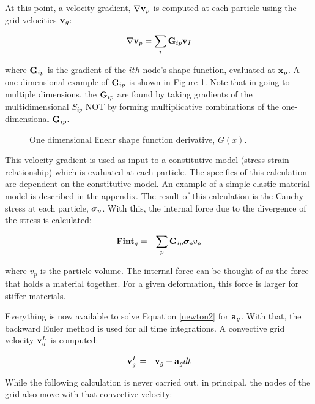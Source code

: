 At this point, a velocity gradient,  $\nabla \mbox{\ensuremath{\mathbf{v}}}_p$ is 
computed at
each particle using the grid velocities $\mbox{\ensuremath{\mathbf{v}}}_g$:

\begin{eqnarray}
	\nabla \mbox{\ensuremath{\mathbf{v}}}_p = \sum_i \mbox{\ensuremath{\mathbf{G}}}_{ip} \mbox{\ensuremath{\mathbf{v}}}_I
 \label{velgrad}
\end{eqnarray}

\noindent
where $\mbox{\ensuremath{\mathbf{G}}}_{ip}$ is the gradient of the $ith$ node's shape 
function,
evaluated at $\mbox{\ensuremath{\mathbf{x}}}_p$.  A one dimensional example of 
$\mbox{\ensuremath{\mathbf{G}}}_{ip}$ is
shown in Figure \ref{fig-Gip}.  Note that in going to multiple dimensions,
the $\mbox{\ensuremath{\mathbf{G}}}_{ip}$ are found by taking gradients of the multidimensional
$S_{ip}$ NOT by forming multiplicative combinations of the one-dimensional
$\mbox{\ensuremath{\mathbf{G}}}_{ip}$.

\begin{figure}[h]
  \hspace{1.75in}
  \caption{\label{fig-Gip} One dimensional linear shape function 
           derivative, $G(x)$.}
\end{figure}
This velocity gradient is used as input to a constitutive model 
(stress-strain
relationship) which is evaluated at each particle.  The 
specifics of this 
calculation are dependent on the constitutive model.  An example 
of a simple elastic material model is described in the appendix.  
The result of this
calculation is the Cauchy stress at each particle, $\boldsymbol{\sigma}_p$.  
With this,
the internal force due to the divergence of the stress is 
calculated:

\begin{eqnarray}
	\mbox{\ensuremath{\mathbf{Fint}}}_g &=& \sum_{p} \mbox{\ensuremath{\mathbf{G}}}_{ip} \mbox{\boldmath $\sigma \!\!$ \unboldmath}_p v_p
\end{eqnarray}

\noindent
where $v_p$ is the particle volume.  The internal force can be 
thought of as the force that holds a material together.  For a 
given deformation, this force is larger for stiffer materials.

Everything is now available to solve Equation \ref{newton2} for 
$\mbox{\ensuremath{\mathbf{a}}}_g$.
With that, the backward Euler method is used for all time 
integrations.
A convective grid velocity $\mbox{\ensuremath{\mathbf{v}}}^L_g$ is computed:

\begin{eqnarray}
	\mbox{\ensuremath{\mathbf{v}}}^L_g &=& \mbox{\ensuremath{\mathbf{v}}}_g  + \mbox{\ensuremath{\mathbf{a}}}_g dt
\end{eqnarray}

While the following calculation is never carried out, in 
principal, the
nodes of the grid also move with that convective velocity:

